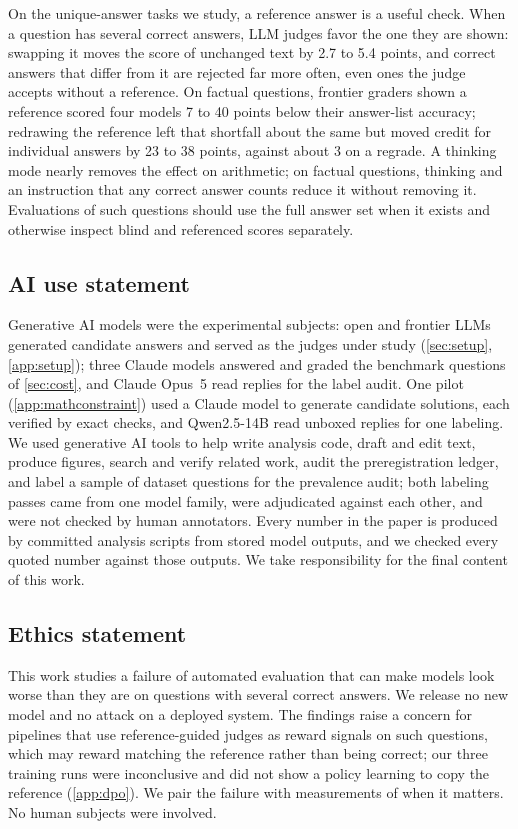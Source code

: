 \documentclass{article}
\begin{document}
On the unique-answer tasks we study, a reference answer is a useful check.
When a question has several correct answers, LLM judges favor the one they are shown: swapping it moves the score of unchanged text by 2.7 to 5.4 points, and correct answers that differ from it are rejected far more often, even ones the judge accepts without a reference. On factual questions, frontier graders shown a reference scored four models 7 to 40 points below their answer-list accuracy; redrawing the reference left that shortfall about the same but moved credit for individual answers by 23 to 38 points, against about 3 on a regrade.
A thinking mode nearly removes the effect on arithmetic; on factual questions, thinking and an instruction that any correct answer counts reduce it without removing it.
Evaluations of such questions should use the full answer set when it exists and otherwise inspect blind and referenced scores separately.

\subsection*{AI use statement}
Generative AI models were the experimental subjects: open and frontier LLMs generated candidate answers and served as the judges under study (\cref{sec:setup}, \cref{app:setup}); three Claude models answered and graded the benchmark questions of \cref{sec:cost}, and Claude Opus~5 read replies for the label audit. One pilot (\cref{app:mathconstraint}) used a Claude model to generate candidate solutions, each verified by exact checks, and Qwen2.5-14B read unboxed replies for one labeling. We used generative AI tools to help write analysis code, draft and edit text, produce figures, search and verify related work, audit the preregistration ledger, and label a sample of dataset questions for the prevalence audit; both labeling passes came from one model family, were adjudicated against each other, and were not checked by human annotators. Every number in the paper is produced by committed analysis scripts from stored model outputs, and we checked every quoted number against those outputs. We take responsibility for the final content of this work.

\subsection*{Ethics statement}
This work studies a failure of automated evaluation that can make models look worse than they are on questions with several correct answers. We release no new model and no attack on a deployed system. The findings raise a concern for pipelines that use reference-guided judges as reward signals on such questions, which may reward matching the reference rather than being correct; our three training runs were inconclusive and did not show a policy learning to copy the reference (\cref{app:dpo}). We pair the failure with measurements of when it matters. No human subjects were involved.
\end{document}
